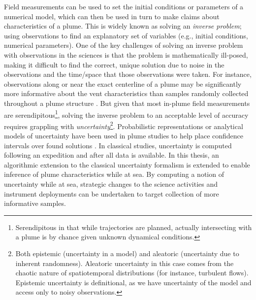 Field measurements can be used to set the initial conditions or parameters of a numerical model, which can then be used in turn to make claims about characteristics of a plume.
This is widely known as solving an \emph{inverse problem}; using observations to find an explanatory set of variables (e.g., initial conditions, numerical parameters).
One of the key challenges of solving an inverse problem with observations in the sciences is that the problem is mathematically ill-posed, making it difficult to find the correct, unique solution due to noise in the observations and the time/space that those observations were taken.
For instance, observations along or near the exact centerline of a plume may be significantly more informative about the vent characteristics \autocite{bangian2022solution} than samples randomly collected throughout a plume structure \autocite{baker1998rise}.
But given that most in-plume field measurements are serendipitous\footnote{Serendipitous in that while trajectories are planned, actually intersecting with a plume is by chance given unknown dynamical conditions.}, solving the inverse problem to an acceptable level of accuracy requires grappling with \emph{uncertainty}\footnote{Both epistemic (uncertainty in a model) and aleatoric (uncertainty due to inherent randomness). Aleatoric uncertainty in this case comes from the chaotic nature of spatiotemporal distributions (for instance, turbulent flows). Epistemic uncertainty is definitional, as we have uncertainty of the model and access only to noisy observations.}.
Probabilistic representations or analytical models of uncertainty have been used in plume studies to help place confidence intervals over found solutions \autocite{bemis1993geothermal,sohn2019observations}.
In classical studies, uncertainty is computed following an expedition and after all data is available.
In this thesis, an algorithmic extension to the classical uncertainty formalism is extended to enable inference of plume characteristics while at sea.
By computing a notion of uncertainty while at sea, strategic changes to the science activities and instrument deployments can be undertaken to target collection of more informative samples.



